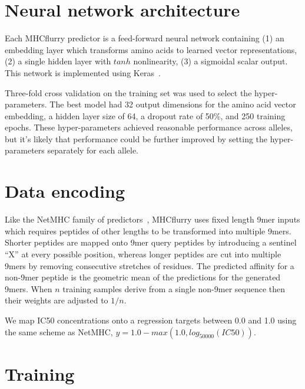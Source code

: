 \section{Neural network architecture}
Each MHCflurry predictor is a feed-forward neural network containing (1) an embedding layer which transforms amino acids to learned vector representations, (2) a single hidden layer with $tanh$ nonlinearity, (3) a sigmoidal scalar output. This network is implemented using Keras~\cite{chollet2015}.  


Three-fold cross validation on the training set was used to select the hyper-parameters. The best model had 32 output dimensions for the amino acid vector embedding, a hidden layer size of 64, a dropout rate of 50\%, and 250 training epochs. These hyper-parameters achieved reasonable performance across alleles, but it's likely that performance could be further improved by setting the hyper-parameters separately for each allele.

\section{Data encoding}

Like the NetMHC family of predictors~\cite{lundegaard2008accurate}, MHCflurry uses fixed length 9mer inputs which requires peptides of other lengths to be transformed into multiple 9mers. Shorter peptides are mapped onto 9mer query peptides by introducing a sentinel ``X'' at every possible position, whereas longer peptides are cut into multiple 9mers by removing consecutive stretches of residues. The predicted affinity for a non-9mer peptide is the geometric mean of the predictions for the generated 9mers. When $n$ training samples derive from a single non-9mer sequence then their weights are adjusted to $1/n$. 

We map IC50 concentrations onto a regression targets between 0.0 and 1.0 using the same scheme as NetMHC, $y = 1.0 - max(1.0, log_{50000}(IC50))$.

\section{Training}

